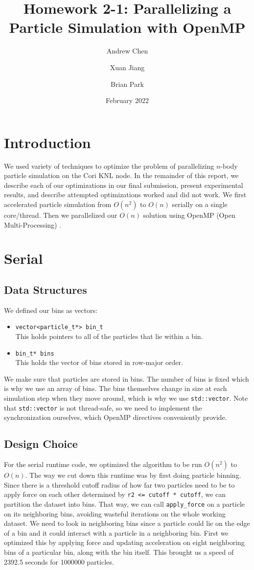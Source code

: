\documentclass{article}
\title{Homework 2-1: Parallelizing a Particle Simulation with OpenMP}
\author{Andrew Chen}
\author{Xuan Jiang}
\author{Brian Park}
\affil{UC Berkeley, Computer Science 267}
\date{February 2022}
\begin{document}
\maketitle
\section{Introduction}
We used variety of techniques to optimize the problem of parallelizing $n$-body particle simulation on the Cori KNL node. In the remainder of this report, we describe each of our optimizations in our final submission, present experimental results, and describe attempted optimizations worked and did not work. We first accelerated particle simulation from $O(n^2)$ to $O(n)$ serially on a single core/thread. Then we parallelized our $O(n)$ solution using OpenMP (Open Multi-Processing) \cite{openmp}.

\section{Serial}

\subsection{Data Structures}
We defined our bins as vectors:

\begin{itemize}
    \item \verb|vector<particle_t*> bin_t| \\
        This holds pointers to all of the particles that lie within a bin.
    \item \verb|bin_t* bins| \\
        This holds the vector of bins stored in row-major order.
\end{itemize}

We make sure that particles are stored in bins. The number of bins is fixed which is why we use an array of bins. The bins themselves change in size at each simulation step when they move around, which is why we use \verb|std::vector|. Note that \verb|std::vector| is not thread-safe, so we need to implement the synchronization ourselves, which OpenMP directives conveniently provide.

\subsection{Design Choice}
For the serial runtime code, we optimized the algorithm to be run $O(n^2)$ to $O(n)$. The way we cut down this runtime was by first doing particle binning. Since there is a threshold cutoff radius of how far two particles need to be to apply force on each other determined by \verb|r2 <= cutoff * cutoff|, we can partition the dataset into bins. That way, we can call \verb|apply_force| on a particle on its neighboring bins, avoiding wasteful iterations on the whole working dataset. We need to look in neighboring bins since a particle could lie on the edge of a bin and it could interact with a particle in a neighboring bin. First we optimized this by applying force and updating acceleration on eight neighboring bins of a particular bin, along with the bin itself. This brought us a speed of 2392.5 seconds for 1000000 particles.
\end{document}
